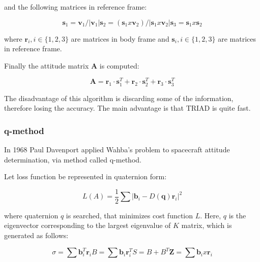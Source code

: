 \documentclass[12pt,a4paper,oneside]{article}
\begin{document}
and the following matrices in reference frame:

\begin{subequations}
\begin{equation}
\bm{s}_1 = \bm{v}_1/|\bm{v}_1|
\end{equation}
\begin{equation}
\bm{s}_2 = (\bm{s}_1 x \bm{v}_2) /|\bm{s}_1 x \bm{v}_2|
\end{equation}
\begin{equation}
\bm{s}_3 = \bm{s}_1 x \bm{s}_2
\end{equation}
\end{subequations}

where $\bm{r}_i, i\in\{1, 2, 3\}$ are matrices in body frame and $\bm{s}_i, i\in\{1, 2, 3\}$ are matrices in reference frame.


Finally the attitude matrix $\bm{A}$ is computed:

\begin{equation}
\bm{A} = \bm{r}_1 \cdot \bm{s}_1^T + \bm{r}_2 \cdot \bm{s}_2^T + \bm{r}_3 \cdot \bm{s}_3^T 
\end{equation}


The disadvantage of this algorithm is discarding some of the information, therefore losing the accuracy. The main advantage is that TRIAD is quite fast.


\subsubsection{q-method}

In 1968 Paul Davenport applied Wahba’s problem to spacecraft attitude determination, via method called q-method\cite{keat1977analysis}. 

Let loss function be represented in quaternion form:

\begin{equation}
L(A) = \frac{1}{2} \sum |\bm{b}_i - D(\bm{q})\bm{r}_i|^2
\end{equation}

where quaternion $q$ is searched, that minimizes cost function $L$. Here, $q$ is the eigenvector corresponding to the largest eigenvalue of $K$ matrix, which is generated as follows:

\begin{subequations}
\begin{equation}
\sigma = \sum \bm{b}_i^T\bm{r}_i
\end{equation}
\begin{equation}
B = \sum \bm{b}_i\bm{r}_i^T
\end{equation}
\begin{equation}
S = B + B^T
\end{equation}
\begin{equation}
\bm{Z} = \sum \bm{b}_i x \bm{r}_i
\end{equation}
\end{subequations}
\end{document}
